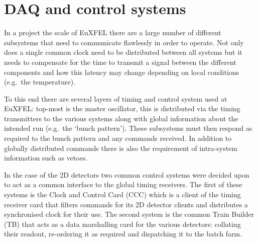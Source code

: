     

\section{DAQ and control systems} %
\label{sec:daq_and_control_systems}
In a project the scale of EuXFEL there are a large number of different subsystems that need to communicate flawlessly in order to operate. Not only does a single common clock need to be distributed between all systems but it needs to compensate for the time to transmit a signal between the different components and how this latency may change depending on local conditions (e.g.\ the temperature).

To this end there are several layers of timing and control system used at EuXFEL: top-most is the master oscillator, this is distributed via the timing transmitters to the various systems along with global information about the intended run (e.g.\ the `bunch pattern'). These subsystems must then respond as required to the bunch pattern and any commands received. In addition to globally distributed commands there is also the requirement of intra-system information such as vetoes. 

In the case of the 2D detectors two common control systems were decided upon to act as a common interface to the global timing receivers. The first of these systems is the Clock and Control Card (CCC) which is a client of the timing receiver card that filters commands for its 2D detector clients and distributes a synchronised clock for their use. The second system is the common Train Builder (TB) that acts as a data marshalling card for the various detectors: collating their readout, re-ordering it as required and dispatching it to the batch farm.

